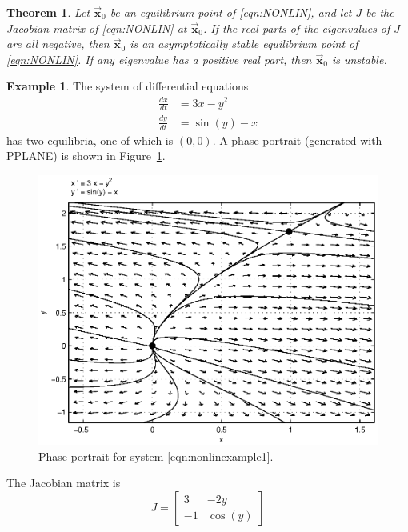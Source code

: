 \documentclass[reqno]{immbook}
\newcommand{\BX}{\vec{\textbf{x}}}
\numberwithin{equation}{chapter}
\newtheorem{theorem}{Theorem}
\numberwithin{question}{section}
\numberwithin{theorem}{chapter}
\numberwithin{figure}{chapter}
\theoremstyle{definition}
\newtheorem{example}{Example}[section]
\begin{document}
\begin{theorem}
Let $\BX_0$ be an equilibrium point of
\eqref{eqn:NONLIN}, and let $J$ be the Jacobian
matrix of \eqref{eqn:NONLIN} at $\BX_0$.
If the real parts of the eigenvalues of $J$
are all negative, then $\BX_0$ is an
asymptotically stable equilibrium point
of \eqref{eqn:NONLIN}.
If any eigenvalue has a positive real part,
then $\BX_0$ is unstable.
\end{theorem}

\begin{example}
The system of differential equations
\begin{equation}
\begin{split}
   \frac{dx}{dt} & = 3x-y^2 \\
   \frac{dy}{dt} & = \sin(y)-x
\end{split}
\label{eqn:nonlinexample1}
\end{equation}
has two equilibria, one of which is  $(0,0)$.
A phase portrait (generated with PPLANE) is shown in
Figure~\ref{fig:nonlinexample1}.
\begin{figure}
\centerline{%
\includegraphics[width=5in]{pplane_plots/NonlinExample1.ps}
}
\caption{Phase portrait for system \eqref{eqn:nonlinexample1}.}
\label{fig:nonlinexample1}
\end{figure}
  The Jacobian matrix is
\begin{equation}
  J = \begin{bmatrix}
           3 &  -2y \\
	   -1 & \cos(y)
      \end{bmatrix}
\end{equation}

\end{example}
\end{document}
